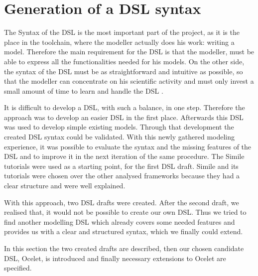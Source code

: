 \chapter{Generation of a DSL syntax} \label{chap:generation_dsl}
\par
The Syntax of the DSL is the most important part of the project, as it is the place in the toolchain, where the modeller actually does his work: writing a model. Therefore the main requirement for the DSL is that the modeller, must be able to express all the functionalities needed for his models. On the other side, the syntax of the DSL must be as straightforward and intuitive as possible, so that the modeller can concentrate on his scientific activity and must only invest a small amount of time to learn and handle the DSL \autocite{dsl:mernik}.
\par
It is difficult to develop a DSL, with such a balance, in one step. Therefore the approach was to develop an easier DSL in the first place. Afterwards this DSL was used to develop simple existing models. Through that development the created DSL syntax could be validated. With this newly gathered modeling experience, it was possible to evaluate the syntax and the missing features of the DSL and to improve it in the next iteration of the same procedure.
The Simile tutorials were used as a starting point, for the first DSL draft. Simile and its tutorials were chosen over the other analysed frameworks because they had a clear structure and were well explained.
\par
With this approach, two DSL drafts were created. After the second draft, we realised that, it would not be possible to create our own DSL. Thus we tried to find another modelling DSL which already covers some needed features and provides us with a clear and structured syntax, which we finally could extend.
\par
In this section the two created drafts are described, then our chosen candidate DSL, Ocelet, is introduced and finally necessary extensions to Ocelet are specified.

